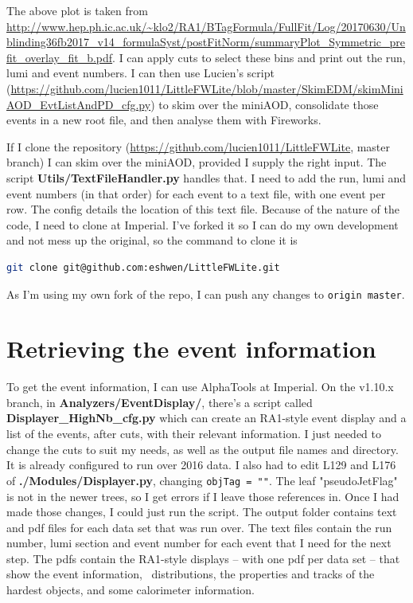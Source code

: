 
The above plot is taken from \url{http://www.hep.ph.ic.ac.uk/~klo2/RA1/BTagFormula/FullFit/Log/20170630/Unblinding36fb2017_v14_formulaSyst/postFitNorm/summaryPlot_Symmetric_prefit_overlay_fit_b.pdf}. I can apply cuts to select these bins and print out the run, lumi and event numbers. I can then use Lucien's script (\url{https://github.com/lucien1011/LittleFWLite/blob/master/SkimEDM/skimMiniAOD_EvtListAndPD_cfg.py}) to skim over the miniAOD, consolidate those events in a new root file, and then analyse them with Fireworks.

If I clone the repository (\url{https://github.com/lucien1011/LittleFWLite}, master branch) I can skim over the miniAOD, provided I supply the right input. The script \textbf{Utils/TextFileHandler.py} handles that. I need to add the run, lumi and event numbers (in that order) for each event to a text file, with one event per row. The config details the location of this text file. Because of the nature of the code, I need to clone at Imperial. I've forked it so I can do my own development and not mess up the original, so the command to clone it is

\begin{lstlisting}[belowskip=-0.7cm, language=sh, numbers=none]
git clone git@github.com:eshwen/LittleFWLite.git
\end{lstlisting}

As I'm using my own fork of the repo, I can push any changes to \texttt{origin master}.


\section{Retrieving the event information}

To get the event information, I can use AlphaTools at Imperial. On the v1.10.x branch, in \textbf{Analyzers/EventDisplay/}, there's a script called \textbf{Displayer\_HighNb\_cfg.py} which can create an RA1-style event display and a list of the events, after cuts, with their relevant information. I just needed to change the cuts to suit my needs, as well as the output file names and directory. It is already configured to run over 2016 data. I also had to edit L129 and L176 of \textbf{./Modules/Displayer.py}, changing \texttt{objTag = ""}. The leaf "pseudoJetFlag" is not in the newer trees, so I get errors if I leave those references in. Once I had made those changes, I could just run the script. The output folder contains text and pdf files for each data set that was run over. The text files contain the run number, lumi section and event number for each event that I need for the next step. The pdfs contain the RA1-style displays -- with one pdf per data set -- that show the event information, \alphat\ distributions, the properties and tracks of the hardest objects, and some calorimeter information.

